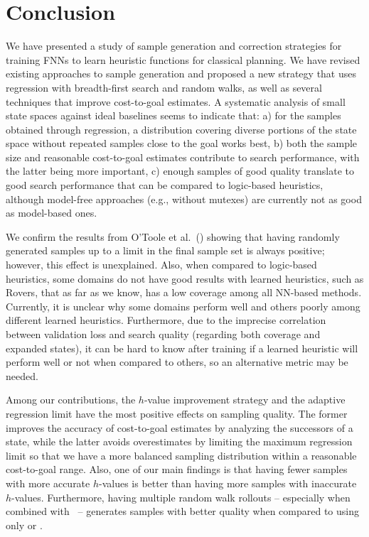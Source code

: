 \chapter{Conclusion}
\label{sec:conclusion}

We have presented a study of sample generation and correction strategies for training FNNs to learn heuristic functions for classical planning. We have revised existing approaches to sample generation and proposed a new strategy that uses regression with breadth-first search and random walks, as well as several techniques that improve cost-to-goal estimates. A systematic analysis of small state spaces against ideal baselines seems to indicate that: a) for the samples obtained through regression, a distribution covering diverse portions of the state space without repeated samples close to the goal works best, b) both the sample size and reasonable cost-to-goal estimates contribute to search performance, with the latter being more important, c) enough samples of good quality translate to good search performance that can be compared to logic-based heuristics, although model-free approaches (e.g., without mutexes) are currently not as good as model-based ones.

We confirm the results from O'Toole et al.~(\citeyear{OToole/2022}) showing that having randomly generated samples up to a limit in the final sample set is always positive; however, this effect is unexplained. Also, when compared to logic-based heuristics, some domains do not have good results with learned heuristics, such as Rovers, that as far as we know, has a low coverage among all NN-based methods. Currently, it is unclear why some domains perform well and others poorly among different learned heuristics. Furthermore, due to the imprecise correlation between validation loss and search quality (regarding both coverage and expanded states), it can be hard to know after training if a learned heuristic will perform well or not when compared to others, so an alternative metric may be needed.

Among our contributions, the $h$-value improvement strategy \hvfc and the adaptive regression limit \meanfx have the most positive effects on sampling quality. The former improves the accuracy of cost-to-goal estimates by analyzing the successors of a state, while the latter avoids overestimates by limiting the maximum regression limit so that we have a more balanced sampling distribution within a reasonable cost-to-goal range. Also, one of our main findings is that having fewer samples with more accurate $h$-values is better than having more samples with inaccurate $h$-values.
Furthermore, having multiple random walk rollouts -- especially when combined with \bfs~-- generates samples with better quality when compared to using only \bfs or \dfs.
